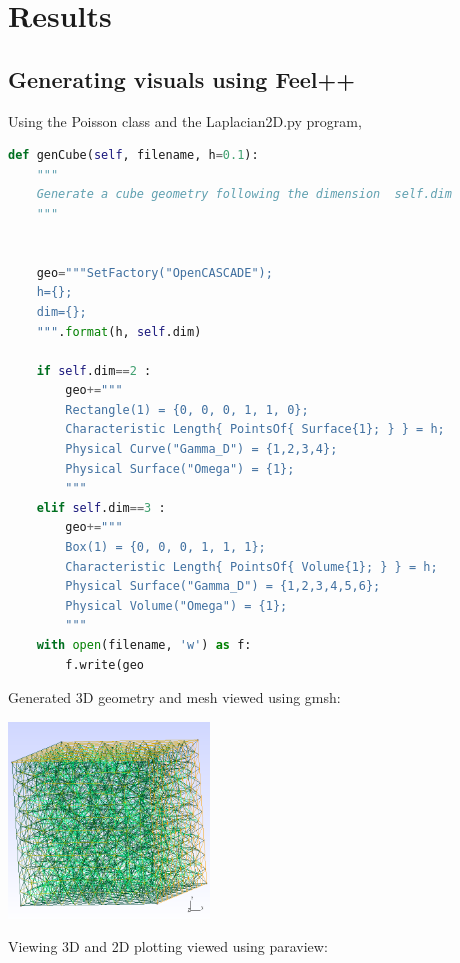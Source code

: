 \documentclass[12pt]{article}
\begin{document}
\section{Results}
\subsection{Generating visuals using Feel++}

Using the Poisson class and the Laplacian2D.py program,


\begin{lstlisting}[language=Python,caption={},frame=single, backgroundcolor=\color{gray!10}, basicstyle=\footnotesize,rulecolor=\color{blue}, framexleftmargin=3pt, commentstyle=\color{mygreen}, keywordstyle=\color{blue}]
def genCube(self, filename, h=0.1):
    """
    Generate a cube geometry following the dimension  self.dim
    """

    
    geo="""SetFactory("OpenCASCADE");
    h={};
    dim={};
    """.format(h, self.dim)
    
    if self.dim==2 :
        geo+="""
        Rectangle(1) = {0, 0, 0, 1, 1, 0};
        Characteristic Length{ PointsOf{ Surface{1}; } } = h;
        Physical Curve("Gamma_D") = {1,2,3,4};
        Physical Surface("Omega") = {1};
        """
    elif self.dim==3 :
        geo+="""
        Box(1) = {0, 0, 0, 1, 1, 1};
        Characteristic Length{ PointsOf{ Volume{1}; } } = h;
        Physical Surface("Gamma_D") = {1,2,3,4,5,6};
        Physical Volume("Omega") = {1};
        """
    with open(filename, 'w') as f:
        f.write(geo
\end{lstlisting}

Generated 3D geometry and mesh viewed using gmsh:

\begin{frame}{}
        \includegraphics[width=0.4\textwidth]{images/fppmsh.png}
\end{frame}


Viewing 3D and 2D plotting viewed using paraview:
\end{document}
